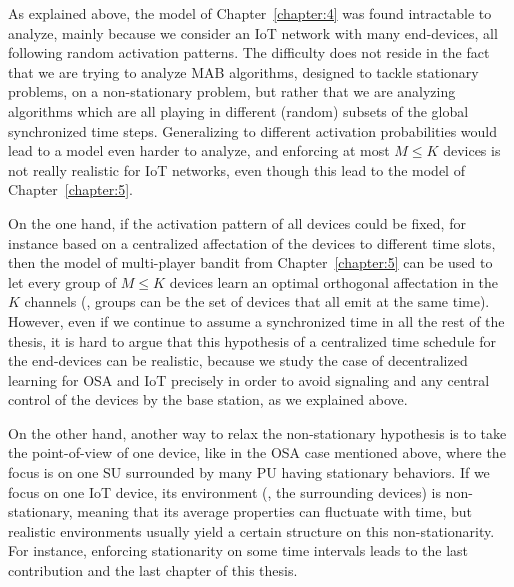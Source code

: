 As explained above, the model of Chapter~\ref{chapter:4} was found intractable to analyze, mainly because we consider an IoT network with many end-devices, all following random activation patterns.
The difficulty does not reside in the fact that we are trying to analyze MAB algorithms, designed to tackle stationary problems, on a non-stationary problem,
but rather that we are analyzing algorithms which are all playing in different (random) subsets of the global synchronized time steps.
Generalizing to different activation probabilities would lead to a model even harder to analyze, and enforcing at most $M \leq K$ devices is not really realistic for IoT networks, even though this lead to the model of Chapter~\ref{chapter:5}.

On the one hand, if the activation pattern of all devices could be fixed, for instance based on a centralized affectation of the devices to different time slots, then the model of multi-player bandit from Chapter~\ref{chapter:5} can be used to let every group of $M \leq K$ devices learn an optimal orthogonal affectation in the $K$ channels (\eg, groups can be the set of devices that all emit at the same time).
%
However, even if we continue to assume a synchronized time in all the rest of the thesis,
it is hard to argue that this hypothesis of a centralized time schedule for the end-devices can be realistic, because we study the case of decentralized learning for OSA and IoT precisely in order to avoid signaling and any central control of the devices by the base station, as we explained above.

On the other hand, another way to relax the non-stationary hypothesis is to take the point-of-view of one device, like in the OSA case mentioned above, where the focus is on one SU surrounded by many PU having stationary behaviors.
If we focus on one IoT device, its environment (\ie, the surrounding devices) is non-stationary, meaning that its average properties can fluctuate with time, but realistic environments usually yield a certain structure on this non-stationarity.
For instance, enforcing stationarity on some time intervals leads to the last contribution and the last chapter of this thesis.


